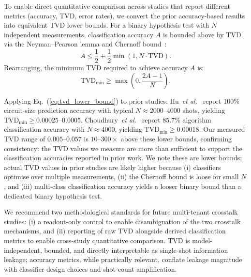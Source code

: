 \documentclass[ASNA,twocolumn]{USG}
\begin{document}
To enable direct quantitative comparison across studies that report different metrics (accuracy, TVD, error rates), we convert the prior accuracy-based results into equivalent TVD lower bounds. For a binary hypothesis test with $N$ independent measurements, classification accuracy $A$ is bounded above by TVD via the Neyman--Pearson lemma and Chernoff bound~\cite{preskill2018nisq}:
\begin{equation}
    A \leq \frac{1}{2} + \frac{1}{2} \min(1, N \cdot \mathrm{TVD}).
    \label{eq:accuracy_bound}
\end{equation}
Rearranging, the minimum TVD required to achieve accuracy $A$ is:
\begin{equation}
    \mathrm{TVD}_{\mathrm{min}} \geq \max\left(0, \frac{2A - 1}{N}\right).
    \label{eq:tvd_lower_bound}
\end{equation}

Applying Eq.~(\ref{eq:tvd_lower_bound}) to prior studies: Hu~\emph{et al.}~\cite{hu2025swap} report $100\%$ circuit-size prediction accuracy with typical $N \approx 2000$--$4000$ shots, yielding $\mathrm{TVD}_{\mathrm{min}} \geq 0.00025$--$0.0005$. Choudhury~\emph{et al.}~\cite{choudhury2024crosstalk} report $85.7\%$ algorithm classification accuracy with $N \approx 4000$, yielding $\mathrm{TVD}_{\mathrm{min}} \geq 0.00018$. Our measured TVD range of $0.005$--$0.057$ is $10$--$300\times$ above these lower bounds, confirming consistency: the TVD values we measure are more than sufficient to support the classification accuracies reported in prior work. We note these are lower bounds; actual TVD values in prior studies are likely higher because (i) classifiers optimise over multiple measurements, (ii) the Chernoff bound is loose for small $N$, and (iii) multi-class classification accuracy yields a looser binary bound than a dedicated binary hypothesis test.

We recommend two methodological standards for future multi-tenant crosstalk studies: (i) a readout-only control to enable disambiguation of the two crosstalk mechanisms, and (ii) reporting of raw TVD alongside derived classification metrics to enable cross-study quantitative comparison. TVD is model-independent, bounded, and directly interpretable as single-shot information leakage; accuracy metrics, while practically relevant, conflate leakage magnitude with classifier design choices and shot-count amplification.
\end{document}
